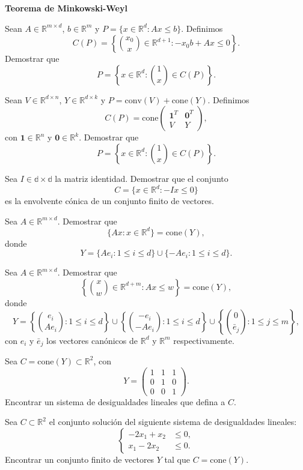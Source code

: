 \documentclass[a4paper,12pt]{article}
\renewcommand{\conv}[1]{\mathrm{conv}(#1)}
\renewcommand{\cone}[1]{\mathrm{cone}(#1)}
\begin{document}
\noindent\textbf{Teorema de Minkowski-Weyl}
\begin{exerciselist}
    \item Sean $A \in \mathbb{R}^{m \times d}$, $b \in \mathbb{R}^m$ y $P = \{ x \in \mathbb{R}^d : Ax \leq b \}$. Definimos
    \[
    C(P) = \left\{ {x_0 \choose x} \in \mathbb{R}^{d+1} : -x_0 b + A x \leq 0 \right\}.
    \]
    Demostrar que 
    $$
    P = \left\{ x \in \mathbb{R}^d : {1 \choose x} \in C(P) \right\}.
    $$
    \item Sean $V \in \mathbb{R}^{d \times n}$, $Y \in \mathbb{R}^{d \times k}$ y $P = \conv{V} + \cone{Y}$. Definimos
    \[
    C(P) = \textrm{cone}\left(\begin{array}{cc}
        \mathbf{1}^T & \mathbf{0}^T\\
        V & Y
    \end{array}\right),
    \]
    con $\mathbf{1} \in \mathbb{R}^n$ y $\mathbf{0} \in \mathbb{R}^k$. Demostrar que 
    $$
    P = \left\{ x \in \mathbb{R}^d : {1 \choose x} \in C(P) \right\}.
    $$
\item Sea $I \in \mathbb{d \times d}$ la matriz identidad. Demostrar que el conjunto
$$
C = \{ x \in \mathbb{R}^d : -I x \leq 0 \}
$$
es la envolvente cónica de un conjunto finito de vectores.

\item Sea $A \in \mathbb{R}^{m \times d}$. Demostrar que
$$
\{ Ax  : x \in \mathbb{R}^d \} = \cone{Y},
$$
donde 
$$
Y = \{Ae_i : 1 \leq i \leq d\} \cup \{-Ae_i : 1 \leq i \leq d\}.
$$ 

\item Sea $A \in \mathbb{R}^{m \times d}$. Demostrar que
$$
\left\{ {x \choose w} \in \mathbb{R}^{d+m} : A x \leq w \right\} = \cone{Y},
$$
donde 
$$
Y = \left\{{e_i \choose Ae_i} : 1 \leq i \leq d\right\} \cup \left\{{-e_i \choose -Ae_i} : 1 \leq i \leq d\right\} \cup \left\{{0 \choose \bar{e}_j} : 1 \leq j \leq m\right\},
$$ 
con $e_i$ y $\bar{e}_j$ los vectores canónicos de $\mathbb{R}^d$ y $\mathbb{R}^m$ respectivamente.
\item Sea $C= \cone{Y} \subset \mathbb{R}^2$, con 
$$
Y = \left(\begin{array}{ccc}
    1 & 1 & 1\\
    0 & 1 & 0 \\
    0 & 0 & 1
\end{array}\right).
$$ 
Encontrar un sistema de desigualdades lineales que defina a $C$.
\item Sea $C \subset \mathbb{R}^2$ el conjunto solución del siguiente sistema de desigualdades lineales:
$$\left\{\begin{aligned}
    -2x_1 + x_2 &\leq 0,\\
    x_1 - 2x_2 &\leq 0.
\end{aligned}\right.$$
Encontrar un conjunto finito de vectores $Y$ tal que $C = \cone{Y}$.
\end{exerciselist}
\end{document}
